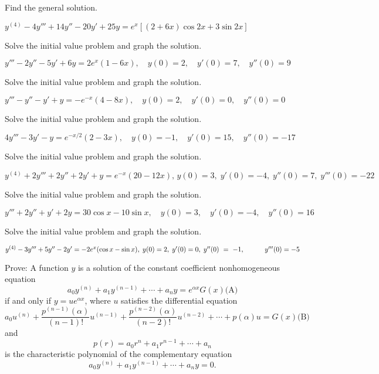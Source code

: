\documentclass{ximera}
\begin{document}
\begin{problem}\label{exer:9.3.68}   Find the general solution. 

$y^{(4)}-4y'''+14y''-20y'+25y=e^x\left[(2+6x)\cos
2x+3\sin2x\right]$
\end{problem}

\begin{problem}\label{exer:9.3.69} Solve the initial value problem and graph the solution.

$y'''-2y''-5y'+6y=2e^x(1-6x),\quad
y(0)=2,
\quad y'(0)=7,\quad y''(0)=9$
\end{problem}

\begin{problem}\label{exer:9.3.70} Solve the initial value problem and graph the solution.

$y'''-y''-y'+y=-e^{-x}(4-8x),\quad
y(0)=2,
\quad y'(0)=0,\quad y''(0)=0$
\end{problem}

\begin{problem}\label{exer:9.3.71} Solve the initial value problem and graph the solution. 

$4y'''-3y'-y=e^{-x/2}(2-3x),\quad
y(0)=-1,
\quad y'(0)=15,\quad y''(0)=-17$
\end{problem}

\begin{problem}\label{exer:9.3.72}  Solve the initial value problem and graph the solution.

$y^{(4)}+2y'''+2y''+2y'+y=e^{-x}(20-12x),\,
y(0)=3,\; y'(0)=-4,\; y''(0)=7,\; y'''(0)=-22$
\end{problem}

\begin{problem}\label{exer:9.3.73}  Solve the initial value problem and graph the solution.

$y'''+2y''+y'+2y=30\cos x-10\sin x,
\quad y(0)=3,\quad y'(0)=-4,\quad y''(0)=16$
\end{problem}

\begin{problem}\label{exer:9.3.74}  Solve the initial value problem and graph the solution.

$y^{(4)}-3y'''+5y''-2y'=-2e^x(\cos x-\sin
x),\; y(0)=2,\; y'(0)=0,\; y''(0)~=~-1, \\ \hspace*{30pt} y'''(0)=-5$
\end{problem}

\begin{problem}\label{exer:9.3.75}
Prove:
A function $y$ is a solution of the constant coefficient
nonhomogeneous equation
$$
a_0y^{(n)}+a_1y^{(n-1)}+\cdots+a_ny=e^{\alpha x}G(x)
\text{(A)}
$$
if and only if $y=ue^{\alpha x}$, where $u$ satisfies the differential
equation
$$
a_0u^{(n)}+\frac{p^{(n-1)}(\alpha)}{(n-1)!}u^{(n-1)}+
\frac{p^{(n-2)}(\alpha)}{(n-2)!}u^{(n-2)}+\cdots+p(\alpha)u=G(x)
\text{(B)}
$$
and
$$
p(r)=a_0r^n+a_1r^{n-1} + \cdots + a_n
$$
is the characteristic polynomial of the complementary equation
$$
a_0y^{(n)}+a_1y^{(n-1)}+\cdots+a_ny=0.
$$
\end{problem}
\end{document}

